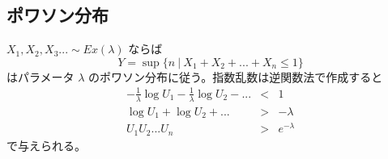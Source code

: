\documentclass[10pt, a4paper]{ltjsarticle}
\begin{document}
\subsection{ポワソン分布}

$X_1,X_2,X_3... \sim Ex(\lambda)$ ならば
\begin{equation}
  Y = \sup \{n~|~X_1+X_2+...+X_n \leq 1\}
\end{equation}
はパラメータ $\lambda$ のポワソン分布に従う。指数乱数は逆関数法で作成すると
\begin{eqnarray}
  -\frac{1}{\lambda} \log U_1 - \frac{1}{\lambda} \log U_2 - ... &<& 1 \\
  \log U_1 +  \log U_2 + ... &>& -\lambda \\
  U_1U_2...U_n &>& e^{-\lambda}
\end{eqnarray}
で与えられる。
\end{document}
